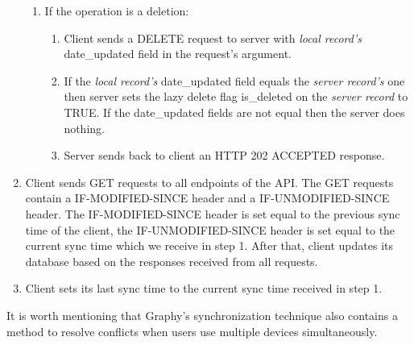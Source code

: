 \begin{enumerate}
\begin{enumerate}
       \item If the operation is a deletion:
         \begin{enumerate}
           \item Client sends a DELETE request to server with \textit{local record's} date\_updated field in the request's argument.
           \item If the \textit{local record's} date\_updated field equals the \textit{server record's} one then server sets the lazy delete flag is\_deleted on the \textit{server record} to TRUE. If the date\_updated fields are not equal then the server does nothing.
           \item Server sends back to client an HTTP 202 ACCEPTED response.
         \end{enumerate}         
     \end{enumerate}
   \item Client sends GET requests to all endpoints of the API. The GET requests contain a IF-MODIFIED-SINCE header and a IF-UNMODIFIED-SINCE header. The IF-MODIFIED-SINCE header is set equal to the previous sync time of the client, the IF-UNMODIFIED-SINCE header is set equal to the current sync time which we receive in step 1. After that, client updates its database based on the responses received from all requests.
   \item Client sets its last sync time to the current sync time received in step 1.
\end{enumerate}

It is worth mentioning that Graphy's synchronization technique also contains a method to resolve conflicts when users use multiple devices simultaneously. 
